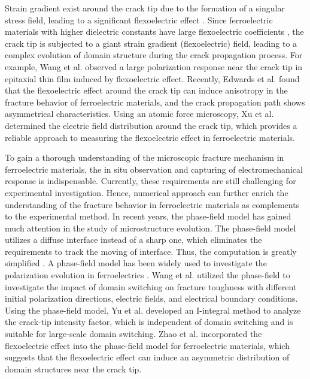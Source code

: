 \documentclass[times,fleqn,11pt]{elsarticle}
\begin{document}
Strain gradient exist around the crack tip due to the formation of a singular stress field, leading to a significant flexoelectric effect \cite{zubko_flexoelectric_2013,yudin_fundamentals_2013}. Since ferroelectric materials with higher dielectric constants have large flexoelectric coefficients \cite{ma_flexoelectricity_2006,hong_first-principles_2013}, the crack tip is subjected to a giant strain gradient (flexoelectric) field, leading to a complex evolution of domain structure during the crack propagation process. For example, Wang et al. \cite{wang_direct_2020} observed a large polarization response near the crack tip in  epitaxial thin film induced by flexoelectric effect. Recently, Edwards et al. \cite{cordero-edwards_flexoelectric_2019} found that the flexoelectric effect around the crack tip can induce anisotropy in the fracture behavior of ferroelectric materials, and the crack propagation path shows asymmetrical characteristics.  Using an atomic force microscopy, Xu et al. \cite{xu_directly_2023} determined the electric field distribution around the crack tip, which provides a reliable approach to measuring the flexoelectric effect in ferroelectric materials. 

To gain a thorough understanding of the microscopic fracture mechanism in ferroelectric materials, the in situ observation and capturing of electromechanical response is indispensable. Currently, these requirements are still challenging for experimental investigation. Hence, numerical approach can further enrich the understanding of the fracture behavior in ferroelectric materials as complements to the experimental method. In recent years, the phase-field model has gained much attention in the study of microstructure evolution. The phase-field model utilizes a diffuse interface instead of a sharp one, which eliminates the requirements to track the moving of interface. Thus, the computation is greatly simplified \cite{chen_phase-field_2002}. A phase-field model has been widely used to investigate the polarization evolution in ferroelectrics \cite{wang_phase-field_2004,su_continuum_2007,hong_stability_2017,yuan_defect-mediated_2018}. Wang et al. \cite{wang_phase_2007,wang_phase_2008,wang_three-dimensional_2009,wang_effect_2010} utilized the phase-field to investigate the impact of domain switching on fracture toughness with different initial polarization directions, electric fields, and electrical boundary conditions. Using the phase-field model, Yu \cite{yu_i-integral_2016} et al. developed an I-integral method to analyze the crack-tip intensity factor, which is independent of domain switching and is suitable for large-scale domain switching. Zhao et al. \cite{zhao_effect_2018} incorporated the flexoelectric effect into the phase-field model for ferroelectric materials, which suggests that the flexoelectric effect can induce an asymmetric distribution of domain structures near the crack tip.
\end{document}
